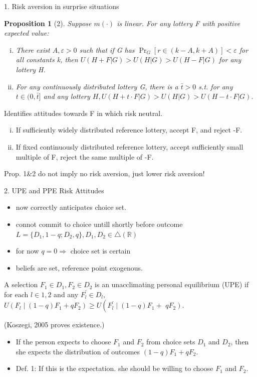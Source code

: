 \documentclass[11pt,aspectratio=169]{beamer}
\newtheorem{proposition}{Proposition}
\begin{document}
\begin{frame}{1. Risk aversion in surprise situations}
    \begin{proposition}[2]
        Suppose $m(\cdot)$ is linear. For any lottery F with positive expected value:
        \begin{enumerate}[(i)]
            \item There exist $A, \varepsilon >0 $ such that if G has $\Pr_G[r \in (k-A, k+A)]< \varepsilon $ for all constants k, then $U(H+F|G)> U(H|G)>U(H-F|G)$ for any lottery H.\medskip
            \item For any continuously distributed lottery G, there is a $\bar{t}>0 $ s.t. for any $t \in (0,\bar{t}]$ and any lottery $H, U(H+t\cdot F|G)> U(H|G)> U(H-t \cdot F|G)$.\medskip
        \end{enumerate}
    \end{proposition}
Identifies attitudes towards F in which risk neutral.\\
    \begin{enumerate}[(i)]
        \item If sufficiently widely distributed reference lottery, accept F, and reject -F.\medskip
        \item If fixed continuously distributed reference lottery, accept sufficiently small multiple of F, reject the same multiple of -F.\medskip
    \end{enumerate}
Prop. 1\&2 do not imply no risk aversion, just lower risk aversion!
\end{frame}

\begin{frame}{2. UPE and PPE Risk Attitudes}
    \begin{itemize}
        \item now correctly anticipates choice set. \medskip
        \item connot commit to choice untill shortly before outcome\\
        $L=\{D_1,1-q;D_2,q\}, D_1,D_2 \in \bigtriangleup (\mathbb{R})$\medskip
        \item for now $q=0 \Rightarrow$ choice set is certain\medskip
        \item beliefs are set, reference point exogenous.\medskip
	\end{itemize}
    \begin{definition}[UPE]
        A selection $F_1 \in D_1, F_2 \in D_2$ is an unacclimating personal equilibrium (UPE) if for each $l \in 1,2$ 
        and any $F_l^{\prime} \in D_l$, $U\left(F_l \mid(1-q) F_1+q F_2\right) \geq U\left(F_l^{\prime} \mid(1-q) F_1+\right.$ $\left.q F_2\right)$.
    \end{definition}
    (Koszegi, 2005 proves existence.)
    \begin{itemize}
        \item  If the person expects to choose $F_1$ and $F_2$ from choice sets $D_1$ and $D_2$, then she expects the distribution of outcomes $(1-q) F_1+q F_2$.\medskip
        \item Def. 1: If this is the expectation. she should be willing to choose  $F_1$ and $F_2$.\medskip
    \end{itemize}
\end{frame}
\end{document}
